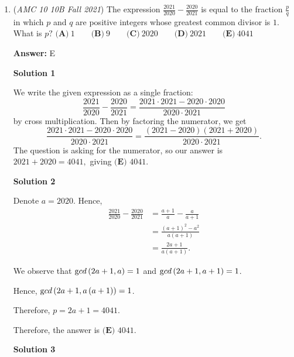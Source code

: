 \begin{enumerate}
We have $4$ lattice points in the interior and $6$ lattice points on the boundary. By \href{https://artofproblemsolving.com/wiki/index.php?title=Pick\%27s\_Theorem}{Pick's Theorem}, the area of the shaded figure is 
 \[4+\frac{6}{2}-1 = 4+3-1 = \boxed{\textbf{(B)} \: 6}.\]~danprathab

 


	\item (\textit{AMC 10 10B Fall 2021}) The expression $\frac{2021}{2020} - \frac{2020}{2021}$ is equal to the fraction $\frac{p}{q}$ in which $p$ and $q$ are positive integers whose greatest common divisor is ${ }1$. What is $p?$
$\textbf{(A)}\: 1\qquad\textbf{(B)} \: 9\qquad\textbf{(C)} \: 2020\qquad\textbf{(D)} \: 2021\qquad\textbf{(E)} \: 4041$

 \textbf{Answer: }E



\textbf{Solution 1}

We write the given expression as a single fraction: 
 \[\frac{2021}{2020} - \frac{2020}{2021} = \frac{2021\cdot2021-2020\cdot2020}{2020\cdot2021}\] by cross multiplication. Then by factoring the numerator, we get 
 \[\frac{2021\cdot2021-2020\cdot2020}{2020\cdot2021}=\frac{(2021-2020)(2021+2020)}{2020\cdot2021}.\] The question is asking for the numerator, so our answer is $2021+2020=4041,$ giving $\boxed{\textbf{(E) }4041}$.

 



\textbf{Solution 2}

Denote $a = 2020$. Hence,
 \begin{align*} \frac{2021}{2020} - \frac{2020}{2021} & = \frac{a + 1}{a} - \frac{a}{a + 1} \\ & = \frac{\left( a + 1 \right)^2 - a^2}{a \left( a + 1 \right)} \\ & = \frac{2 a + 1}{a \left( a + 1 \right)} . \end{align*}


 We observe that ${\textrm gcd} \left( 2a + 1 , a \right) = 1$ and ${\textrm gcd} \left( 2a + 1 , a + 1 \right) = 1$.

 Hence, ${\textrm gcd} \left( 2a + 1 , a \left( a + 1 \right) \right) = 1$.

 Therefore, $p = 2 a + 1 = 4041$.

 Therefore, the answer is $\boxed{\textbf{(E) }4041}$.

 



\textbf{Solution 3}


\end{enumerate}

